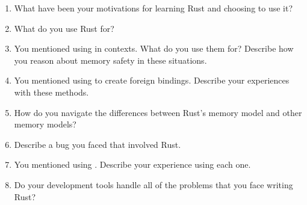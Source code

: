 \begin{enumerate}
\item What have been your motivations for learning Rust and choosing to use it?
\item What do you use \unsafe Rust for?
\item You mentioned using  in \unsafe contexts. What do you use them for? Describe how you reason about memory safety in these situations.
\item You mentioned using  to create foreign bindings. Describe your experiences with these methods. 
\item How do you navigate the differences between Rust's memory model and other memory models? 
\item Describe a bug you faced that involved \unsafe Rust.
\item You mentioned using . Describe your experience using each one. 
\item Do your development tools handle all of the problems that you face writing \unsafe Rust?
\end{enumerate}

